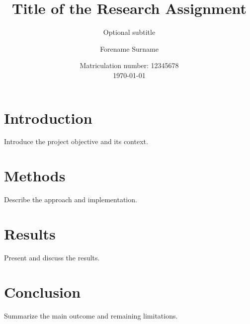 \documentclass[
  paper=a4,
  fontsize=11pt,
  english,
  numbers=noenddot,
  parskip=half,
  cdgeometry=symmetric,
  cd=barcolor,
  cdfont=false
]{tudscrartcl}
\institute{}
\title{Title of the Research Assignment}
\subtitle{Optional subtitle}
\author{Forename Surname}
\date{Matriculation number: 12345678\\[0.5em]\today}
\begin{document}
\maketitle
\tableofcontents
\clearpage

\section{Introduction}

Introduce the project objective and its context.

\section{Methods}

Describe the approach and implementation.

\section{Results}

Present and discuss the results.

\section{Conclusion}

Summarize the main outcome and remaining limitations.

\printbibliography[heading=bibintoc]

\clearpage
\appendix

\end{document}
